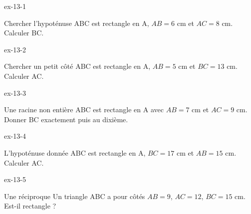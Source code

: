 \clearpage{}
\begin{blocLivre}{ex-13-1}\begin{exercice}[1]{Chercher l’hypoténuse}
ABC est rectangle en A, $AB=6$ cm et $AC=8$ cm. Calculer BC.
\label{fig-ex-13-1}
\end{exercice}\end{blocLivre}
\begin{blocLivre}{ex-13-2}\begin{exercice}[1]{Chercher un petit côté}
ABC est rectangle en A, $AB=5$ cm et $BC=13$ cm. Calculer AC.
\label{fig-ex-13-2}
\end{exercice}\end{blocLivre}
\begin{blocLivre}{ex-13-3}\begin{exercice}[1]{Une racine non entière}
ABC est rectangle en A avec $AB=7$ cm et $AC=9$ cm. Donner BC exactement puis au dixième.
\label{fig-ex-13-3}
\end{exercice}\end{blocLivre}
\begin{blocLivre}{ex-13-4}\begin{exercice}[1]{L’hypoténuse donnée}
ABC est rectangle en A, $BC=17$ cm et $AB=15$ cm. Calculer AC.
\label{fig-ex-13-4}
\end{exercice}\end{blocLivre}
\begin{blocLivre}{ex-13-5}\begin{exercice}[1]{Une réciproque}
Un triangle ABC a pour côtés $AB=9$, $AC=12$, $BC=15$ cm. Est-il rectangle ?
\label{fig-ex-13-5}
\end{exercice}\end{blocLivre}

